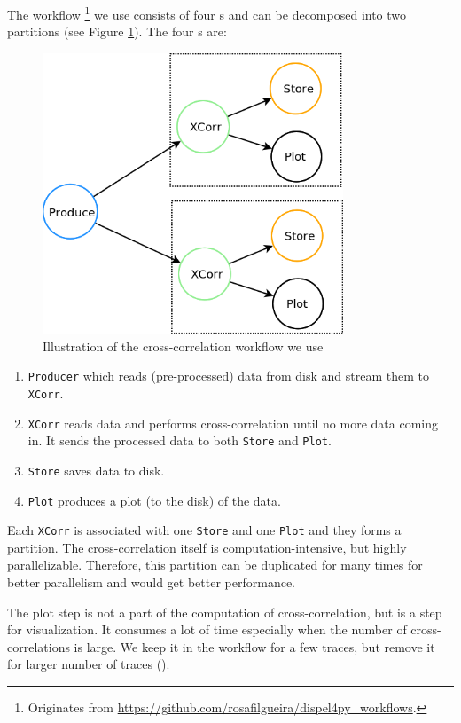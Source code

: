The workflow \footnote{Originates from \url{https://github.com/rosafilgueira/dispel4py_workflows}.} we use consists of four \tPETmpl{}s and can be decomposed into two partitions (see Figure \ref{fig:wf_xcorr_us}). The four \tPETmpl{}s are:

\begin{figure}[h]
\centering
    \includegraphics[width=0.8\textwidth]{figures/wf_xcorr_us}
\caption{Illustration of the cross-correlation workflow we use}
\label{fig:wf_xcorr_us}
\end{figure}

\begin{enumerate}
	\item \lstinline|Producer| which reads (pre-processed) data from disk and stream them to \lstinline|XCorr|.
	\item \lstinline|XCorr| reads data and performs cross-correlation until no more data coming in. It sends the processed data to both \lstinline|Store| and \lstinline|Plot|.
	\item \lstinline|Store| saves data to disk.
	\item \lstinline|Plot| produces a plot (to the disk) of the data.
\end{enumerate}

Each \lstinline|XCorr| is associated with one \lstinline|Store| and one \lstinline|Plot| and they forms a partition. The cross-correlation itself is computation-intensive, but highly parallelizable. Therefore, this partition can be duplicated for many times for better parallelism and would get better performance.

The plot step is not a part of the computation of cross-correlation, but is a step for visualization. It consumes a lot of time especially when the number of cross-correlations is large. We keep it in the workflow for a few traces, but remove it for larger number of traces ().
